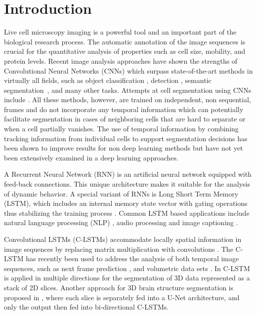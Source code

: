 \documentclass{article}
\begin{document}
\section{Introduction \label{sec:Introduction}}
Live cell microscopy imaging is a powerful tool and an important part of the biological research process. The automatic annotation of the image sequences is crucial for the quantitative analysis of properties such as cell size, mobility, and protein levels. 
Recent image analysis approaches have shown the
strengths of Convolutional Neural Networks (CNNs) which surpass state-of-the-art methods in virtually all fields, such as object classification \cite{krizhevsky12}, detection \cite{redmon2016}, semantic segmentation~\cite{long2015}, and many other tasks. Attempts at cell segmentation using CNNs include \cite{arbelle2017SAN,kraus2016,Ronneberger15}. All these methods, however, are trained on independent, non sequential, frames and do not incorporate any temporal information which can potentially facilitate segmentation in cases of neighboring cells that are hard to separate or when a cell partially vanishes. The use of temporal information by combining tracking information from individual cells to support segmentation decisions has been shown to improve results for non deep learning methods \cite{Amat14,Arbelle15,Schiegg14,arbelle2018probabilistic} but have not yet been extensively examined in a deep learning approaches. 


A Recurrent Neural Network (RNN) is an artificial neural network equipped with feed-back connections. This unique architecture makes it suitable for the analysis of dynamic behavior. A special variant of RNNs is Long Short Term Memory (LSTM), which includes an internal memory state vector with gating operations thus stabilizing the training process \cite{hochreiter1997LSTM}. Common LSTM based applications include natural language processing (NLP) \cite{vinyals2015grammar},  audio processing \cite{sak2014long} and image captioning \cite{xu2015show}.

Convolutional LSTMs (C-LSTMs) accommodate locally spatial information in image sequences by replacing matrix multiplication with convolutions  \cite{xingjian15convLSTM}.  The C-LSTM has recently been used to address the analysis of both temporal image sequences, such as next frame prediction \cite{lotter2016deep}, and  volumetric data sets  \cite{chen2016combining,stollenga2015parallel}. In \cite{stollenga2015parallel} C-LSTM is applied in multiple directions for the segmentation of 3D data represented as a stack of 2D slices.
Another approach for 3D brain structure segmentation is proposed in \cite{chen2016combining}, where each slice is separately fed into a U-Net architecture, and only the output then fed into bi-directional C-LSTMs.
\end{document}
